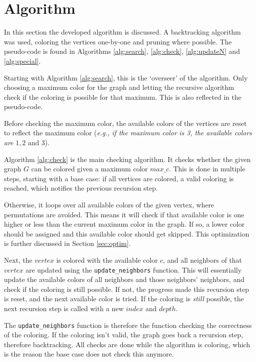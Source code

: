 \documentclass{article}
\begin{document}
\section{Algorithm}
\label{sec:alg}

In this section the developed algorithm is discussed. A backtracking algorithm was used, coloring the vertices one-by-one and pruning where possible. The pseudo-code is found in Algorithms \ref{alg:search}, \ref{alg:check}, \ref{alg:updateN} and \ref{alg:special}. 


Starting with Algorithm \ref{alg:search}, this is the `overseer' of the algorithm. Only choosing a maximum color for the graph and letting the recursive algorithm check if the coloring is possible for that maximum.
This is also reflected in the pseudo-code. 

Before checking the maximum color, the available colors of the vertices are reset to reflect the maximum color (\textit{e.g., if the maximum color is 3, the available colors are ${1, 2 \text{ and } 3}$}).

Algorithm \ref{alg:check} is the main checking algorithm. It checks whether the given graph $G$ can be colored given a maximum color $max\_c$. This is done in multiple steps, starting with a base case: if all vertices are colored, a valid coloring is reached, which notifies the previous recursion step. 

Otherwise, it loops over all available colors of the given vertex, where permutations are avoided. This means it will check if that available color is one higher or less than the current maximum color in the graph. If so, a lower color should be assigned and this available color should get skipped. This optimization is further discussed in Section \ref{sec:optim}.

Next, the $vertex$ is colored with the available color $c$, and all neighbors of that $vertex$ are updated using the \texttt{update\_neighbors} function. This will essentially update the available colors of all neighbors and those neighbors' neighbors, and check if the coloring is still possible. If not, the progress made this recursion step is reset, and the next available color is tried. If the coloring is \textit{still} possible, the next recursion step is called with a new $index$ and $depth$. 

The \texttt{update\_neighbors} function is therefore the function checking the correctness of the coloring. If the coloring isn't valid, the graph goes back a recursion step, therefore backtracking. All checks are done while the algorithm is coloring, which is the reason the base case does not check this anymore.
\end{document}
